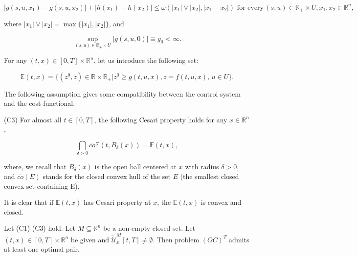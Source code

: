$$|g(s,u,x_1)-g(s,u,x_2)|+|h(x_1)-h(x_2)|\leq \omega(|x_1|\vee |x_2|,|x_1-x_2|)\,\,\mbox{for every}\, (s,u)\in \mathbb{R}_{+}\times U,x_1,x_2\in \mathbb{R}^n,$$

where $|x_1|\vee |x_2|=\max\{|x_1|,|x_2|\}$, and

$$\sup_{(s,u)\in \mathbb{R}_{+}\times U}|g(s,u,0)|\equiv g_0<\infty.$$


For any $(t,x)\in [0,T]\times\mathbb{R}^n$, let us introduce the following set:

$$\mathbb{E}(t,x)=\{(z^0,z)\in \mathbb{R}\times \mathbb{R}_{+}|z^0\geq g(t,u,x),z=f(t,u,x),\, u\in U\}.$$

The following assumption gives some compatibility between the control system and the cost functional.

(C3) For almost all $t\in [0,T]$, the following Cesari property holds for any $x\in \mathbb{R}^n$,

$$\bigcap_{\delta>0}\bar{co}\mathbb{E}(t,B_{\delta}(x))=\mathbb{E}(t,x),$$

where, we recall that $B_{\delta}(x)$ is the open ball centered at $x$ with radius $\delta>0$, and $\bar{co}(E)$ stands for the closed convex hull of the set $E$ (the smallest closed convex set containing E).

It is clear that if $\mathbb{E}(t,x)$ has Cesari property at $x$, the $\mathbb{E}(t,x)$ is convex and closed.

\begin{theorem}\label{ExistsTheo}
	Let (C1)-(C3) hold. Let $M\subseteq \mathbb{R}^n$ be a non-empty closed set. Let $(t,x)\in [0,T]\times\mathbb{R}^n$ be given and $\tilde{\mathcal{U}}^M_x[t,T]\neq \emptyset$. Then problem $(OC)^T$ admits at least one optimal pair.
\end{theorem}

